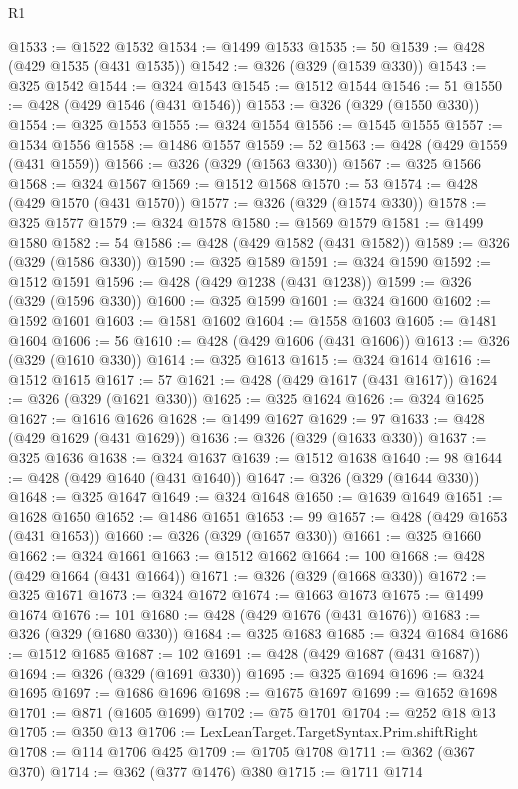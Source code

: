 \begin{lexlean}{R1}
\begin{coremodule}
@1533 := @1522 @1532
@1534 := @1499 @1533
@1535 := 50
@1539 := @428 (@429 @1535 (@431 @1535))
@1542 := @326 (@329 (@1539 @330))
@1543 := @325 @1542
@1544 := @324 @1543
@1545 := @1512 @1544
@1546 := 51
@1550 := @428 (@429 @1546 (@431 @1546))
@1553 := @326 (@329 (@1550 @330))
@1554 := @325 @1553
@1555 := @324 @1554
@1556 := @1545 @1555
@1557 := @1534 @1556
@1558 := @1486 @1557
@1559 := 52
@1563 := @428 (@429 @1559 (@431 @1559))
@1566 := @326 (@329 (@1563 @330))
@1567 := @325 @1566
@1568 := @324 @1567
@1569 := @1512 @1568
@1570 := 53
@1574 := @428 (@429 @1570 (@431 @1570))
@1577 := @326 (@329 (@1574 @330))
@1578 := @325 @1577
@1579 := @324 @1578
@1580 := @1569 @1579
@1581 := @1499 @1580
@1582 := 54
@1586 := @428 (@429 @1582 (@431 @1582))
@1589 := @326 (@329 (@1586 @330))
@1590 := @325 @1589
@1591 := @324 @1590
@1592 := @1512 @1591
@1596 := @428 (@429 @1238 (@431 @1238))
@1599 := @326 (@329 (@1596 @330))
@1600 := @325 @1599
@1601 := @324 @1600
@1602 := @1592 @1601
@1603 := @1581 @1602
@1604 := @1558 @1603
@1605 := @1481 @1604
@1606 := 56
@1610 := @428 (@429 @1606 (@431 @1606))
@1613 := @326 (@329 (@1610 @330))
@1614 := @325 @1613
@1615 := @324 @1614
@1616 := @1512 @1615
@1617 := 57
@1621 := @428 (@429 @1617 (@431 @1617))
@1624 := @326 (@329 (@1621 @330))
@1625 := @325 @1624
@1626 := @324 @1625
@1627 := @1616 @1626
@1628 := @1499 @1627
@1629 := 97
@1633 := @428 (@429 @1629 (@431 @1629))
@1636 := @326 (@329 (@1633 @330))
@1637 := @325 @1636
@1638 := @324 @1637
@1639 := @1512 @1638
@1640 := 98
@1644 := @428 (@429 @1640 (@431 @1640))
@1647 := @326 (@329 (@1644 @330))
@1648 := @325 @1647
@1649 := @324 @1648
@1650 := @1639 @1649
@1651 := @1628 @1650
@1652 := @1486 @1651
@1653 := 99
@1657 := @428 (@429 @1653 (@431 @1653))
@1660 := @326 (@329 (@1657 @330))
@1661 := @325 @1660
@1662 := @324 @1661
@1663 := @1512 @1662
@1664 := 100
@1668 := @428 (@429 @1664 (@431 @1664))
@1671 := @326 (@329 (@1668 @330))
@1672 := @325 @1671
@1673 := @324 @1672
@1674 := @1663 @1673
@1675 := @1499 @1674
@1676 := 101
@1680 := @428 (@429 @1676 (@431 @1676))
@1683 := @326 (@329 (@1680 @330))
@1684 := @325 @1683
@1685 := @324 @1684
@1686 := @1512 @1685
@1687 := 102
@1691 := @428 (@429 @1687 (@431 @1687))
@1694 := @326 (@329 (@1691 @330))
@1695 := @325 @1694
@1696 := @324 @1695
@1697 := @1686 @1696
@1698 := @1675 @1697
@1699 := @1652 @1698
@1701 := @871 (@1605 @1699)
@1702 := @75 @1701
@1704 := @252 @18 @13
@1705 := @350 @13
@1706 := LexLeanTarget.TargetSyntax.Prim.shiftRight
@1708 := @114 @1706 @425
@1709 := @1705 @1708
@1711 := @362 (@367 @370)
@1714 := @362 (@377 @1476) @380
@1715 := @1711 @1714

\end{coremodule}
\end{lexlean}
